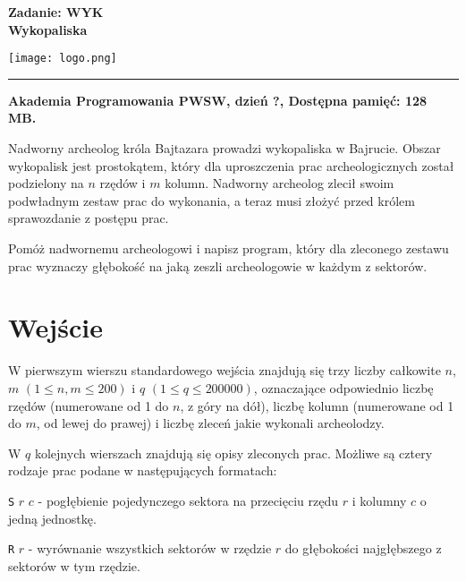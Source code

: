\documentclass[10pt]{article}
\begin{document}
    

    \noindent
    \begin{minipage}{0.5\textwidth}
        \LARGE{\textsf{\textbf{Zadanie: WYK\\Wykopaliska}}}
    \end{minipage}
    \begin{minipage}{0.5\textwidth}
        \begin{flushright}
            \texttt{[image: logo.png]}
        \end{flushright}
    \end{minipage}
    
    \noindent\rule{\textwidth}{0.4pt}
    
    \noindent\textbf{Akademia Programowania PWSW, dzień ?, Dostępna pamięć: 128 MB.}
    \vspace{1em}
    
    
    \noindent
    Nadworny archeolog króla Bajtazara prowadzi wykopaliska w Bajrucie. Obszar wykopalisk jest prostokątem, który dla uproszczenia prac archeologicznych został podzielony na $n$ rzędów i $m$ kolumn. Nadworny archeolog zlecił swoim podwładnym zestaw prac do wykonania, a teraz musi złożyć przed królem sprawozdanie z postępu prac.
    
    Pomóż nadwornemu archeologowi i napisz program, który dla zleconego zestawu prac wyznaczy głębokość na jaką zeszli archeologowie w każdym z sektorów.


    \section*{Wejście}
    
    W pierwszym wierszu standardowego wejścia znajdują się trzy liczby całkowite $n$, $m$ $(1\leq n, m\leq 200)$ i $q$ $(1\leq q\leq 200000)$, oznaczające odpowiednio liczbę rzędów (numerowane od 1 do $n$, z góry na dół), liczbę kolumn (numerowane od 1 do $m$, od lewej do prawej) i liczbę zleceń jakie wykonali archeolodzy.

    W $q$ kolejnych wierszach znajdują się opisy zleconych prac. Możliwe są cztery rodzaje prac podane w następujących formatach:

    \texttt{S} $r$ $c$ - pogłębienie pojedynczego sektora na przecięciu rzędu $r$ i kolumny $c$ o jedną jednostkę. 

    \texttt{R} $r$ - wyrównanie wszystkich sektorów w rzędzie $r$ do głębokości najgłębszego z sektorów w tym rzędzie. 
\end{document}
